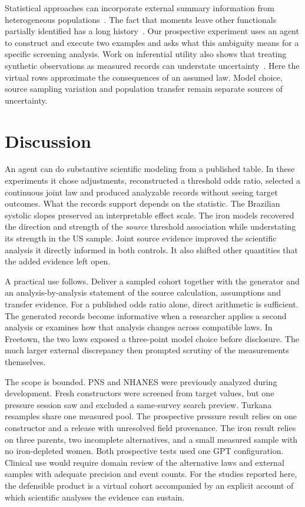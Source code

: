 \documentclass[sigconf,anonymous,review]{acmart}
\begin{document}
Statistical approaches can incorporate external summary information from heterogeneous populations~\cite{syndi}. The fact that moments leave other functionals partially identified has a long history~\cite{bounds}. Our prospective experiment uses an agent to construct and execute two examples and asks what this ambiguity means for a specific screening analysis. Work on inferential utility also shows that treating synthetic observations as measured records can understate uncertainty~\cite{inferential}. Here the virtual rows approximate the consequences of an assumed law. Model choice, source sampling variation and population transfer remain separate sources of uncertainty.

\section{Discussion}
An agent can do substantive scientific modeling from a published table. In these experiments it chose adjustments, reconstructed a threshold odds ratio, selected a continuous joint law and produced analyzable records without seeing target outcomes. What the records support depends on the statistic. The Brazilian systolic slopes preserved an interpretable effect scale. The iron models recovered the direction and strength of the \emph{source} threshold association while understating its strength in the US sample. Joint source evidence improved the scientific analysis it directly informed in both controls. It also shifted other quantities that the added evidence left open.

A practical use follows. Deliver a sampled cohort together with the generator and an analysis-by-analysis statement of the source calculation, assumptions and transfer evidence. For a published odds ratio alone, direct arithmetic is sufficient. The generated records become informative when a researcher applies a second analysis or examines how that analysis changes across compatible laws. In Freetown, the two laws exposed a three-point model choice before disclosure. The much larger external discrepancy then prompted scrutiny of the measurements themselves.

The scope is bounded. PNS and NHANES were previously analyzed during development. Fresh constructors were screened from target values, but one pressure session saw and excluded a same-survey search preview. Turkana resamples share one measured pool. The prospective pressure result relies on one constructor and a release with unresolved field provenance. The iron result relies on three parents, two incomplete alternatives, and a small measured sample with no iron-depleted women. Both prospective tests used one GPT configuration. Clinical use would require domain review of the alternative laws and external samples with adequate precision and event counts. For the studies reported here, the defensible product is a virtual cohort accompanied by an explicit account of which scientific analyses the evidence can sustain.



\appendix

\end{document}
